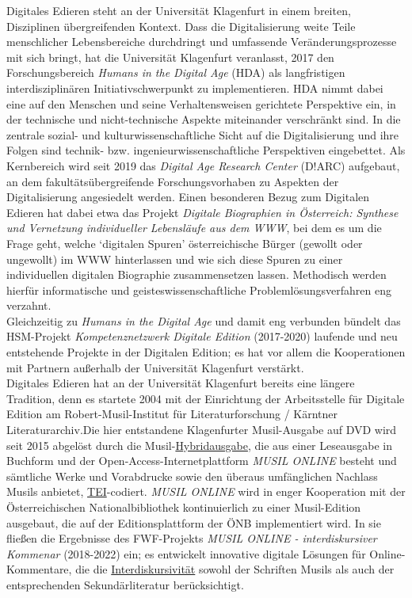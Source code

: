 \documentclass{article}
\begin{document}
    Digitales Edieren steht an der Universität Klagenfurt in einem breiten, Disziplinen übergreifenden Kontext. Dass die Digitalisierung weite Teile menschlicher Lebensbereiche durchdringt und umfassende Veränderungsprozesse mit sich bringt, hat die Universität Klagenfurt veranlasst, 2017 den Forschungsbereich \emph{Humans in the Digital Age }(HDA) als langfristigen interdisziplinären Initiativschwerpunkt zu implementieren. HDA nimmt dabei eine auf den Menschen und seine Verhaltensweisen gerichtete Perspektive ein, in der technische und nicht-technische Aspekte miteinander verschränkt sind. In die zentrale sozial- und kulturwissenschaftliche Sicht auf die Digitalisierung und ihre Folgen sind technik- bzw. ingenieurwissenschaftliche Perspektiven eingebettet. Als Kernbereich wird seit 2019 das \emph{Digital Age Research Center} (D!ARC) aufgebaut, an dem fakultätsübergreifende Forschungsvorhaben zu Aspekten der Digitalisierung angesiedelt werden. Einen besonderen Bezug zum Digitalen Edieren hat dabei etwa das Projekt \emph{Digitale Biographien in Österreich: Synthese und Vernetzung individueller Lebensläufe aus dem WWW}, bei dem es um die Frage geht, welche ‘digitalen Spuren’ österreichische Bürger (gewollt oder ungewollt) im WWW hinterlassen und wie sich diese Spuren zu einer individuellen digitalen Biographie zusammensetzen lassen. Methodisch werden hierfür informatische und geisteswissenschaftliche Problemlösungsverfahren eng verzahnt.\\
            
        Gleichzeitig zu \emph{Humans in the Digital Age} und damit eng verbunden bündelt das HSM-Projekt \emph{Kompetenznetzwerk Digitale Edition} (2017-2020) laufende und neu entstehende Projekte in der Digitalen Edition; es hat vor allem die Kooperationen mit Partnern außerhalb der Universität Klagenfurt verstärkt.\\
            
        Digitales Edieren hat an der Universität Klagenfurt bereits eine längere Tradition, denn es startete 2004 mit der Einrichtung der Arbeitsstelle für Digitale Edition am Robert-Musil-Institut für Literaturforschung / Kärntner Literaturarchiv.Die hier entstandene Klagenfurter Musil-Ausgabe auf DVD wird seit 2015 abgelöst durch die Musil-\href{http://gams.uni-graz.at/o:konde.96}{Hybridausgabe}, die aus einer Leseausgabe in Buchform und der Open-Access-Internetplattform \emph{MUSIL ONLINE} besteht und sämtliche Werke und Vorabdrucke sowie den überaus umfänglichen Nachlass Musils anbietet, \href{http://gams.uni-graz.at/o:konde.178}{TEI}-codiert. \emph{MUSIL ONLINE} wird in enger Kooperation mit der Österreichischen Nationalbibliothek kontinuierlich zu einer Musil-Edition ausgebaut, die auf der Editionsplattform der ÖNB implementiert wird. In sie fließen die Ergebnisse des FWF-Projekts \emph{MUSIL ONLINE - interdiskursiver Kommenar} (2018-2022) ein; es entwickelt innovative digitale Lösungen für Online-Kommentare, die die \href{http://gams.uni-graz.at/o:konde.19}{Interdiskursivität} sowohl der Schriften Musils als auch der entsprechenden Sekundärliteratur berücksichtigt.\\
            
\end{document}
